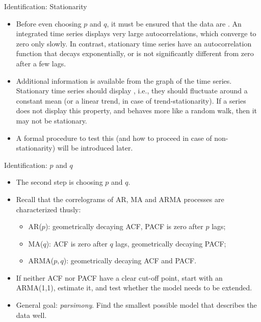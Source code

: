 \begin{frame}{Identification: Stationarity}
\begin{itemize}
\item Before even choosing $p$ and $q$, it must be ensured that the data are . An integrated time series displays
very large autocorrelations, which converge to zero only slowly. In
contrast, stationary time series have an autocorrelation function that
decays exponentially, or is not significantly different from zero after a
few lags.

\item Additional information is available from the graph of the time series.
Stationary time series should display , i.e., they should
fluctuate around a constant mean (or a linear trend, in case of
trend-stationarity). If a series does not display this property, and behaves
more like a random walk, then it may not be stationary.

\item A formal procedure to test this (and how to proceed in case of non-stationarity) will be introduced later.
\end{itemize}
\end{frame}
\begin{frame}{Identification: $p$ and $q$}
\begin{itemize}
\item The second step is choosing $p$ and $q$.
\item Recall that the correlograms of AR, MA and ARMA processes are characterized thusly:

\begin{itemize}
\item AR($p$): geometrically decaying ACF, PACF is zero after $p$ lags;

\item MA($q$): ACF is zero after $q$ lags, geometrically decaying PACF;

\item ARMA($p, q$): geometrically decaying ACF and PACF.
\end{itemize}

\item If neither ACF nor PACF have a clear cut-off point,
start with an ARMA(1,1), estimate it, and test whether the model
needs to be extended.
\item General goal: \emph{\color{red} parsimony}. Find the smallest possible model that describes the data well.
\end{itemize}
\end{frame}

